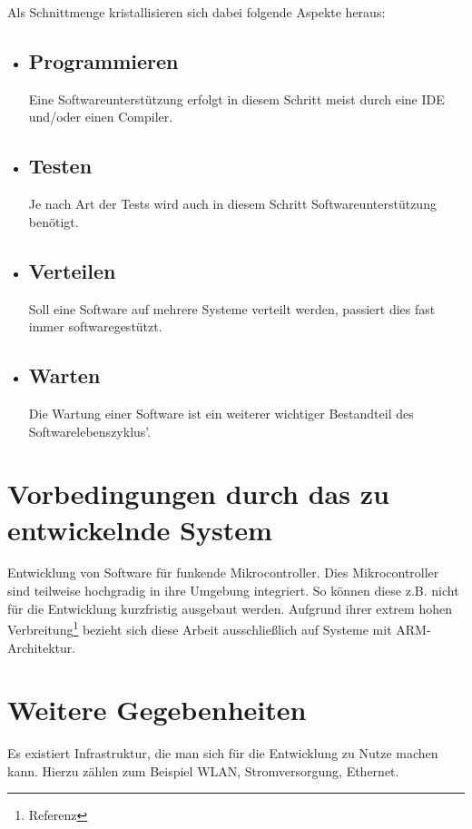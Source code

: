 Als Schnittmenge kristallisieren sich dabei folgende Aspekte heraus:
\begin{itemize}
  \item \subsection*{Programmieren} Eine Softwareunterstützung erfolgt in diesem
  Schritt meist durch eine IDE und/oder einen Compiler.
  \item \subsection*{Testen} Je nach Art der Tests wird auch in diesem Schritt
  Softwareunterstützung benötigt. 
  \item \subsection*{Verteilen} Soll eine Software auf mehrere
  Systeme verteilt werden, passiert dies fast immer softwaregestützt.
  \item \subsection*{Warten} Die Wartung einer Software ist ein weiterer
  wichtiger Bestandteil des Softwarelebenszyklus'.
\end{itemize}
\section{Vorbedingungen durch das zu entwickelnde System}\label{sec:vorb}
Entwicklung von Software für funkende Mikrocontroller. Dies Mikrocontroller sind
teilweise hochgradig in ihre Umgebung integriert. So können diese z.B.
nicht für die Entwicklung kurzfristig ausgebaut werden. Aufgrund ihrer extrem
hohen Verbreitung\footnote{Referenz} bezieht sich diese Arbeit ausschließlich
auf Systeme mit ARM-Architektur.
\section{Weitere Gegebenheiten}\label{sec:gegeb}
Es existiert Infrastruktur, die man sich für die Entwicklung zu Nutze machen
kann. Hierzu zählen zum Beispiel WLAN, Stromversorgung, Ethernet.

